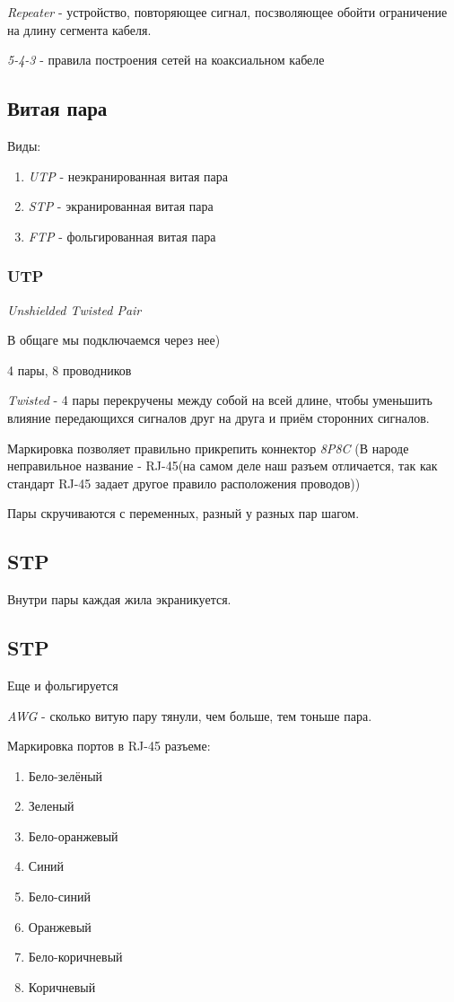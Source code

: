 \documentclass[a4paper,10pt]{article}
\begin{document}
	\emph{Repeater} - устройство, повторяющее сигнал, посзволяющее обойти ограничение на длину сегмента кабеля.
	
	\emph{5-4-3} - правила построения сетей на коаксиальном кабеле
	
	\subsection{Витая пара}
	Виды:
	\begin{enumerate}
		\item \emph{UTP} - неэкранированная витая пара
		\item \emph{STP} - экранированная витая пара
		\item \emph{FTP} - фольгированная витая пара
	\end{enumerate}

	\subsubsection{UTP}
	\emph{Unshielded Twisted Pair}
	
	В общаге мы подключаемся через нее)
	
	4 пары, 8 проводников
	
	\emph{Twisted} - 4 пары перекручены между собой на всей длине, чтобы уменьшить влияние передающихся сигналов друг на друга и приём сторонних сигналов.
	


	Маркировка позволяет правильно прикрепить коннектор \emph{8P8C} (В народе неправильное название - RJ-45(на самом деле наш разъем отличается, так как стандарт RJ-45 задает другое правило расположения проводов))
	
	Пары скручиваются с переменных, разный у разных пар шагом.
	
	\subsection{STP}
	Внутри пары каждая жила экраникуется.
	
	\subsection{STP}
	Еще и фольгируется
	
	
	\emph{AWG} - сколько витую пару тянули, чем больше, тем тоньше пара.
	
		Маркировка портов в RJ-45 разъеме:
	\begin{enumerate}
		\item Бело-зелёный
		\item Зеленый
		\item Бело-оранжевый
		\item Синий
		\item Бело-синий
		\item Оранжевый
		\item Бело-коричневый
		\item Коричневый
	\end{enumerate}
	
\end{document}
